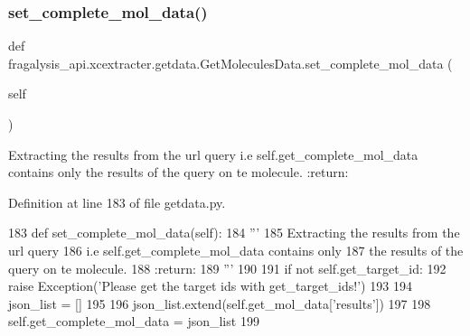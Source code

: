\subsubsection{\texorpdfstring{set\+\_\+complete\+\_\+mol\+\_\+data()}{set\_complete\_mol\_data()}}
{\footnotesize\ttfamily def fragalysis\+\_\+api.\+xcextracter.\+getdata.\+Get\+Molecules\+Data.\+set\+\_\+complete\+\_\+mol\+\_\+data (\begin{DoxyParamCaption}\item[{}]{self }\end{DoxyParamCaption})}

\begin{DoxyVerb}Extracting the results from the url query
i.e self.get_complete_mol_data contains only
the results of the query on te molecule.
:return:
\end{DoxyVerb}
 

Definition at line 183 of file getdata.\+py.


\begin{DoxyCode}
183     \textcolor{keyword}{def }set\_complete\_mol\_data(self):
184         \textcolor{stringliteral}{'''}
185 \textcolor{stringliteral}{        Extracting the results from the url query}
186 \textcolor{stringliteral}{        i.e self.get\_complete\_mol\_data contains only}
187 \textcolor{stringliteral}{        the results of the query on te molecule.}
188 \textcolor{stringliteral}{        :return:}
189 \textcolor{stringliteral}{        '''}
190 
191         \textcolor{keywordflow}{if} \textcolor{keywordflow}{not} self.get\_target\_id:
192             \textcolor{keywordflow}{raise} Exception(\textcolor{stringliteral}{'Please get the target ids with get\_target\_ids!'})
193 
194         json\_list = []
195 
196         json\_list.extend(self.get\_mol\_data[\textcolor{stringliteral}{'results'}])
197 
198         self.get\_complete\_mol\_data = json\_list
199         
\end{DoxyCode}
\mbox{\label{classfragalysis__api_1_1xcextracter_1_1getdata_1_1_get_molecules_data_ab1f0b5b8edbd496d800e08c7f8758a53}} 
